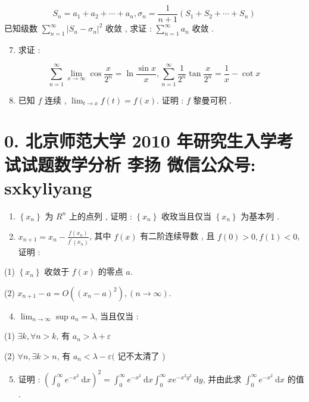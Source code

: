 \documentclass[10pt]{article}
\begin{document}
{\begin{enumerate}
\end{enumerate}
$$
S_{n}=a_{1}+a_{2}+\cdots+a_{n}, \sigma_{n}=\frac{1}{n+1}\left(S_{1}+S_{2}+\cdots+S_{n}\right)
$$
 已知级数  $\sum_{n=1}^{\infty}\left|S_{n}-\sigma_{n}\right|^{2}$  收敛 ,  求证 : $\sum_{n=1}^{\infty} a_{n}$  收敛 .

\begin{enumerate}
  \setcounter{enumi}{6}
  \item  求证 :
\end{enumerate}
$$
\sum_{n=1}^{\infty} \lim _{x \rightarrow \infty} \cos \frac{x}{2^{n}}=\ln \frac{\sin x}{x}, \sum_{n=1}^{\infty} \frac{1}{2^{n}} \tan \frac{x}{2^{n}}=\frac{1}{x}-\cot x
$$

\begin{enumerate}
  \setcounter{enumi}{7}
  \item  已知  $f$  连续 , $\lim _{t \rightarrow x} f(t)=f(x)$.  证明 : $f$  黎曼可积 .
\end{enumerate}
\section{0. 北京师范大学 2010 年研究生入学考试试题数学分析 
 李扬 
 微信公众号: sxkyliyang}
\begin{enumerate}
  \item $\left\{x_{n}\right\}$  为  $R^{n}$  上的点列 ,  证明 : $\left\{x_{n}\right\}$  收玫当且仅当  $\left\{x_{n}\right\}$  为基本列 .

  \item $x_{n+1}=x_{n}-\frac{f\left(x_{n}\right)}{f^{\prime}\left(x_{n}\right)}$,  其中  $f(x)$  有二阶连续导数 ,  且  $f(0)>0, f(1)<0$,  证明 :

\end{enumerate}
(1) $\left\{x_{n}\right\}$  收敛于  $f(x)$  的零点  $a$.

(2) $x_{n+1}-a=O\left(\left(x_{n}-a\right)^{2}\right),(n \rightarrow \infty)$.

\begin{enumerate}
  \setcounter{enumi}{3}
  \item $\lim _{n \rightarrow \infty} \sup a_{n}=\lambda$,  当且仅当 :
\end{enumerate}
(1) $\exists k, \forall n>k$,  有  $a_{n}>\lambda+\varepsilon$

(2) $\forall n, \exists k>n$,  有  $a_{n}<\lambda-\varepsilon($  记不太清了 )

\begin{enumerate}
  \setcounter{enumi}{4}
  \item  证明 : $\left(\int_{0}^{\infty} e^{-x^{2}} \mathrm{~d} x\right)^{2}=\int_{0}^{\infty} e^{-x^{2}} \mathrm{~d} x \int_{0}^{\infty} x e^{-x^{2} y^{2}} \mathrm{~d} y$,  并由此求  $\int_{0}^{\infty} e^{-x^{2}} \mathrm{~d} x$  的值 .


\end{enumerate}}
\end{document}
